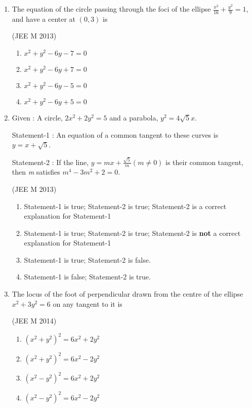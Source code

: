 \documentclass[journal,12pt,twocolumn]{IEEEtran}
\theoremstyle{remark}
\begin{document}
\begin{enumerate}[label=\arabic*.]
    \item The equation of the circle passing through the foci of the ellipse $\frac{x^2}{16}+\frac{y^2}{9}=1$, and have a center at $(0,3)$ is
    
    \hfill(JEE M 2013)
    
    \begin{enumerate}[label=(\alph*)]
    \item$x^2+y^2-6y-7=0$
    \item$x^2+y^2-6y+7=0$
    \item$x^2+y^2-6y-5=0$
    \item$x^2+y^2-6y+5=0$ \\
    \end{enumerate}

    \item
    Given : A circle, $2x^2+2y^2=5$ and a parabola, $y^2=4\sqrt{5}x$.
    
    Statement-1 : An equation of a common tangent to these curves is $y=x+\sqrt{5}$.
    
    Statement-2 : If the line, $y=mx+\frac{\sqrt{5}}{m} (m\neq0)$ is their common tangent, then \textit{m} satisfies $m^4-3m^2+2=0$.

    \hfill(JEE M 2013)
    \begin{enumerate}[label=(\alph*)]
    \item Statement-1 is true; Statement-2 is true; Statement-2 is a correct explanation for Statement-1
    \item Statement-1 is true; Statement-2 is true; Statement-2 is \textbf{not} a correct explanation for Statement-1
    \item Statement-1 is true; Statement-2 is false.
    \item Statement-1 is false; Statement-2 is true.\\
    \end{enumerate}
        
    \item The locus of the foot of perpendicular drawn from the centre of the ellipse $x^2+3y^2=6$ on any tangent to it is
    
    \hfill(JEE M 2014)
    
    \begin{enumerate}[label=(\alph*)]
    \item$\left(x^2+y^2\right)^2=6x^2+2y^2$
    \item$\left(x^2+y^2\right)^2=6x^2-2y^2$
    \item$\left(x^2-y^2\right)^2=6x^2+2y^2$
    \item$\left(x^2-y^2\right)^2=6x^2-2y^2$ \\
    \end{enumerate}


\end{enumerate}
\end{document}
